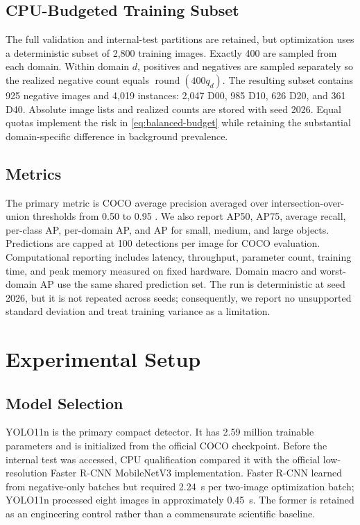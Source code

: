 \documentclass[conference]{ieee-template/vendor/IEEEtran/IEEEtran}
\begin{document}
\subsection{CPU-Budgeted Training Subset}
The full validation and internal-test partitions are retained, but optimization
uses a deterministic subset of 2,800 training images. Exactly 400 are sampled
from each domain. Within domain $d$, positives and negatives are sampled
separately so the realized negative count equals $\operatorname{round}(400q_d)$.
The resulting subset contains 925 negative images and 4,019 instances: 2,047
D00, 985 D10, 626 D20, and 361 D40. Absolute image lists and realized counts are
stored with seed 2026. Equal quotas implement the risk in
\eqref{eq:balanced-budget} while retaining the substantial domain-specific
difference in background prevalence.

\subsection{Metrics}
The primary metric is COCO average precision averaged over intersection-over-
union thresholds from 0.50 to 0.95 \cite{lin2014coco}. We also report AP50,
AP75, average recall, per-class AP, per-domain AP, and AP for small, medium, and
large objects. Predictions are capped at 100 detections per image for COCO
evaluation. Computational reporting includes latency, throughput, parameter
count, training time, and peak memory measured on fixed hardware. Domain macro
and worst-domain AP use the same shared prediction set. The run is deterministic
at seed 2026, but it is not repeated across seeds; consequently, we report no
unsupported standard deviation and treat training variance as a limitation.

\section{Experimental Setup}
\label{sec:setup}

\subsection{Model Selection}
YOLO11n is the primary compact detector. It has 2.59 million trainable
parameters and is initialized from the official COCO checkpoint. Before the
internal test was accessed, CPU qualification compared it with the official
low-resolution Faster R-CNN MobileNetV3 implementation. Faster R-CNN learned
from negative-only batches but required 2.24~s per two-image optimization batch;
YOLO11n processed eight images in approximately 0.45~s. The former is retained
as an engineering control rather than a commensurate scientific baseline.
\end{document}
